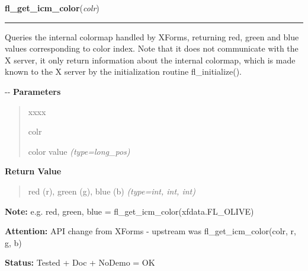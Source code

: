\hspace{.8\funcindent}\begin{boxedminipage}{\funcwidth}

    \raggedright \textbf{fl\_get\_icm\_color}(\textit{colr})

    \vspace{-1.5ex}

    \rule{\textwidth}{0.5\fboxrule}
\setlength{\parskip}{2ex}

Queries the internal colormap handled by XForms, returning red, green
and blue values corresponding to color index. Note that it does not
communicate with the X server, it only return information about the
internal colormap, which is made known to the X server by the
initialization routine fl\_initialize().

-{}-
\setlength{\parskip}{1ex}
      \textbf{Parameters}
      \vspace{-1ex}

      \begin{quote}
        \begin{Ventry}{xxxx}

          \item[colr]


color value
            {\it (type=long\_pos)}

        \end{Ventry}

      \end{quote}

      \textbf{Return Value}
    \vspace{-1ex}

      \begin{quote}

red (r), green (g), blue (b)
      {\it (type=int, int, int)}

      \end{quote}

\textbf{Note:} 
e.g. red, green, blue = fl\_get\_icm\_color(xfdata.FL\_OLIVE)


\textbf{Attention:} 
API change from XForms - upstream was
fl\_get\_icm\_color(colr, r, g, b)


\textbf{Status:} 
Tested + Doc + NoDemo = OK


    \end{boxedminipage}

    \label{xformslib:flbasic:fl_set_icm_color}

